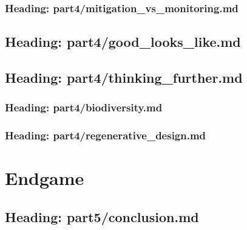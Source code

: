 \documentclass[letterpaper,10pt,english]{jupyterBook}
\begin{document}
\section{Heading: part4/mitigation\_vs\_monitoring.md}
\label{\detokenize{part4/mitigation_vs_monitoring:heading-part4-mitigation-vs-monitoring-md}}\label{\detokenize{part4/mitigation_vs_monitoring::doc}}
\sphinxstepscope


\chapter{Heading: part4/good\_looks\_like.md}
\label{\detokenize{part4/good_looks_like:heading-part4-good-looks-like-md}}\label{\detokenize{part4/good_looks_like::doc}}
\sphinxstepscope


\chapter{Heading: part4/thinking\_further.md}
\label{\detokenize{part4/thinking_further:heading-part4-thinking-further-md}}\label{\detokenize{part4/thinking_further::doc}}
\sphinxstepscope


\section{Heading: part4/biodiversity.md}
\label{\detokenize{part4/biodiversity:heading-part4-biodiversity-md}}\label{\detokenize{part4/biodiversity::doc}}
\sphinxstepscope


\section{Heading: part4/regenerative\_design.md}
\label{\detokenize{part4/regenerative_design:heading-part4-regenerative-design-md}}\label{\detokenize{part4/regenerative_design::doc}}
\sphinxstepscope


\part{End\sphinxhyphen{}game}

\sphinxstepscope


\chapter{Heading: part5/conclusion.md}
\label{\detokenize{part5/conclusion:heading-part5-conclusion-md}}\label{\detokenize{part5/conclusion::doc}}
\sphinxstepscope
\end{document}
